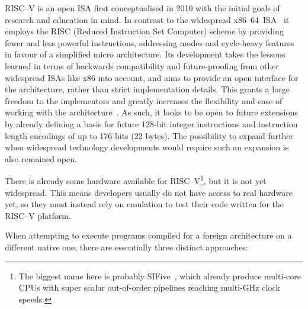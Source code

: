 RISC--V is an open ISA first conceptualised in 2010 with the initial goals of research and education in mind.
In contrast to the widespread x86--64~ISA~\cite{intel2017man} it employs the RISC (Reduced Instruction Set Computer) scheme by providing fewer and less powerful instructions, addressing modes and cycle-heavy features in favour of a simplified micro architecture.
Its development takes the lessons learned in terms of backwards compatibility and future-proofing from other widespread ISAs like x86 into account, and aims to provide an open interface for the architecture, rather than strict implementation details.
This grants a large freedom to the implementors and greatly increases the flexibility and ease of working with the architecture~\cite[S. 1f]{riscvspec}.
As such, it looks to be open to future extensions by already defining a basis for future 128-bit integer instructions and instruction length encodings of up to 176 bits (22 bytes).
The possibility to expand further when widespread technology developments would require such an expansion is also remained open.

There is already some hardware available for RISC--V\footnote{The biggest name here is probably SIFive~\cite{sifive}, which already produce multi-core CPUs with super scalar out-of-order pipelines reaching multi-GHz clock speeds.}, but it is not yet widespread.
This means developers usually do not have access to real hardware yet, so they must instead rely on emulation to test their code written for the RISC--V platform.

When attempting to execute programs compiled for a foreign architecture on a different native one, there are essentially three distinct approaches:

